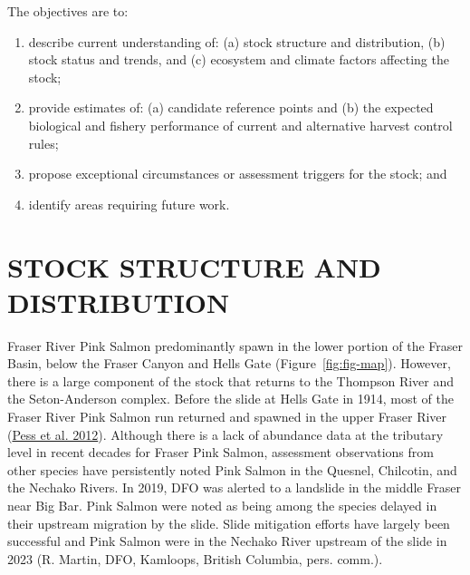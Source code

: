 \documentclass[11pt]{book}
\begin{document}
The objectives are to:
\begin{enumerate}
\def\labelenumi{\arabic{enumi}.}
\item
  describe current understanding of: (a) stock structure and distribution, (b) stock status and trends, and (c) ecosystem and climate factors affecting the stock;
\item
  provide estimates of: (a) candidate reference points and (b) the expected biological and fishery performance of current and alternative harvest control rules;
\item
  propose exceptional circumstances or assessment triggers for the stock; and
\item
  identify areas requiring future work.
\end{enumerate}
\hypertarget{stock-structure-and-distribution}{%
\section{STOCK STRUCTURE AND DISTRIBUTION}\label{stock-structure-and-distribution}}

Fraser River Pink Salmon predominantly spawn in the lower portion of the Fraser Basin, below the Fraser Canyon and Hells Gate (Figure~\ref{fig:fig-map}). However, there is a large component of the stock that returns to the Thompson River and the Seton-Anderson complex. Before the slide at Hells Gate in 1914, most of the Fraser River Pink Salmon run returned and spawned in the upper Fraser River (\protect\hyperlink{ref-pessInfluencePopulationDynamics2012}{Pess et al. 2012}). Although there is a lack of abundance data at the tributary level in recent decades for Fraser Pink Salmon, assessment observations from other species have persistently noted Pink Salmon in the Quesnel, Chilcotin, and the Nechako Rivers. In 2019, DFO was alerted to a landslide in the middle Fraser near Big Bar. Pink Salmon were noted as being among the species delayed in their upstream migration by the slide. Slide mitigation efforts have largely been successful and Pink Salmon were in the Nechako River upstream of the slide in 2023 (R. Martin, DFO, Kamloops, British Columbia, pers. comm.).
\end{document}
